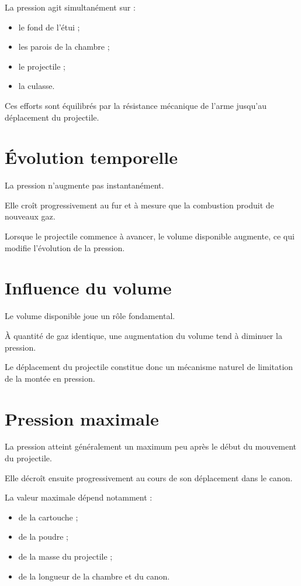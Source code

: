 La pression agit simultanément sur :

\begin{itemize}
    \item le fond de l'étui ;
    \item les parois de la chambre ;
    \item le projectile ;
    \item la culasse.
\end{itemize}

Ces efforts sont équilibrés par la résistance mécanique de l'arme jusqu'au
déplacement du projectile.

\section{Évolution temporelle}

La pression n'augmente pas instantanément.

Elle croît progressivement au fur et à mesure que la combustion produit de
nouveaux gaz.

Lorsque le projectile commence à avancer, le volume disponible augmente, ce qui
modifie l'évolution de la pression.

\section{Influence du volume}

Le volume disponible joue un rôle fondamental.

À quantité de gaz identique, une augmentation du volume tend à diminuer la
pression.

Le déplacement du projectile constitue donc un mécanisme naturel de limitation
de la montée en pression.

\section{Pression maximale}

La pression atteint généralement un maximum peu après le début du mouvement du
projectile.

Elle décroît ensuite progressivement au cours de son déplacement dans le canon.

La valeur maximale dépend notamment :

\begin{itemize}
    \item de la cartouche ;
    \item de la poudre ;
    \item de la masse du projectile ;
    \item de la longueur de la chambre et du canon.
\end{itemize}

